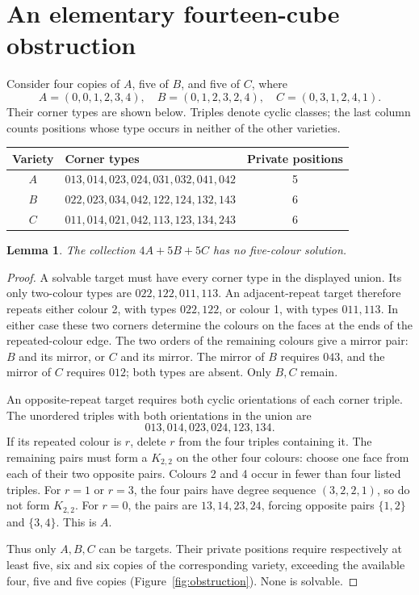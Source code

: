 \documentclass[11pt]{article}
\newtheorem{lemma}[theorem]{Lemma}
\theoremstyle{remark}
\begin{document}
\section{An elementary fourteen-cube obstruction}\label{sec:lower}
Consider four copies of $A$, five of $B$, and five of $C$, where
\[
 A=(0,0,1,2,3,4),\quad B=(0,1,2,3,2,4),\quad C=(0,3,1,2,4,1).
\]
Their corner types are shown below. Triples denote cyclic classes; the last
column counts positions whose type occurs in neither of the other varieties.
\begin{center}
\begin{tabular}{clc}
\toprule
Variety & Corner types & Private positions\\
\midrule
$A$ & $013,014,023,024,031,032,041,042$ & 5\\
$B$ & $022,023,034,042,122,124,132,143$ & 6\\
$C$ & $011,014,021,042,113,123,134,243$ & 6\\
\bottomrule
\end{tabular}
\end{center}
\begin{lemma}\label{lem:lower}
The collection $4A+5B+5C$ has no five-colour solution.
\end{lemma}
\begin{proof}
A solvable target must have every corner type in the displayed union.
Its only two-colour types are $022,122,011,113$. An adjacent-repeat target
therefore repeats either colour 2, with types $022,122$, or colour 1,
with types $011,113$. In either case these two corners determine the colours
on the faces at the ends of the repeated-colour edge. The two orders of the
remaining colours give a mirror pair: $B$ and its mirror, or $C$ and its
mirror. The mirror of $B$ requires $043$, and the mirror of $C$ requires
$012$; both types are absent. Only $B,C$ remain.

An opposite-repeat target requires both cyclic orientations of each corner
triple. The unordered triples with both orientations in the union are
\[
  013,014,023,024,123,134.
\]
If its repeated colour is $r$, delete $r$ from the four triples containing
it. The remaining pairs must form a $K_{2,2}$ on the other four colours:
choose one face from each of their two opposite pairs. Colours 2 and 4
occur in fewer than four listed triples. For $r=1$ or $r=3$, the four pairs
have degree sequence $(3,2,2,1)$, so do not form $K_{2,2}$. For $r=0$, the
pairs are $13,14,23,24$, forcing opposite pairs $\{1,2\}$ and $\{3,4\}$.
This is $A$.

Thus only $A,B,C$ can be targets. Their private positions require respectively
at least five, six and six copies of the corresponding variety, exceeding
the available four, five and five copies (Figure~\ref{fig:obstruction}).
None is solvable.
\end{proof}
\end{document}
